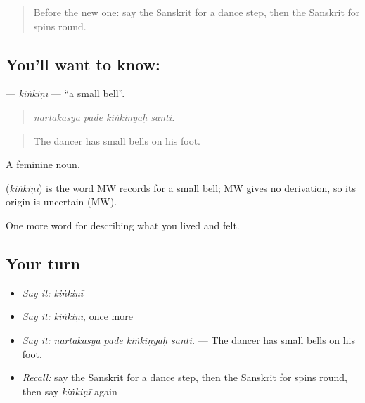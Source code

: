 \label{lesson:SA-C522-kinkini}



\begin{quote}
Before the new one: say the Sanskrit for a dance step, then the Sanskrit for spins round.
\end{quote}

\subsection*{You'll want to know: }
\textbf{} — \emph{kiṅkiṇī} — \textquotedblleft{}a small bell\textquotedblright{}.

\begin{quote}
   
\end{quote}

\begin{quote}
\emph{nartakasya pāde kiṅkiṇyaḥ santi.}
\end{quote}

\begin{quote}
The dancer has small bells on his foot.
\end{quote}

A feminine noun.

\begin{cousinweb}
\textbf{} (\emph{kiṅkiṇī}) is the word MW records for a small bell; MW gives no derivation, so its origin is uncertain (MW).
\end{cousinweb}

\begin{grammarlens}[title={What you've built}]
One more word for describing what you lived and felt.
\end{grammarlens}

\subsection*{Your turn}
\begin{itemize}
\raggedright
  \item \emph{Say it:} \emph{kiṅkiṇī}
  \item \emph{Say it:} \emph{kiṅkiṇī}, once more
  \item \emph{Say it:} \emph{nartakasya pāde kiṅkiṇyaḥ santi.} — The dancer has small bells on his foot.
  \item \emph{Recall:} say the Sanskrit for a dance step, then the Sanskrit for spins round, then say \emph{kiṅkiṇī} again
\end{itemize}

